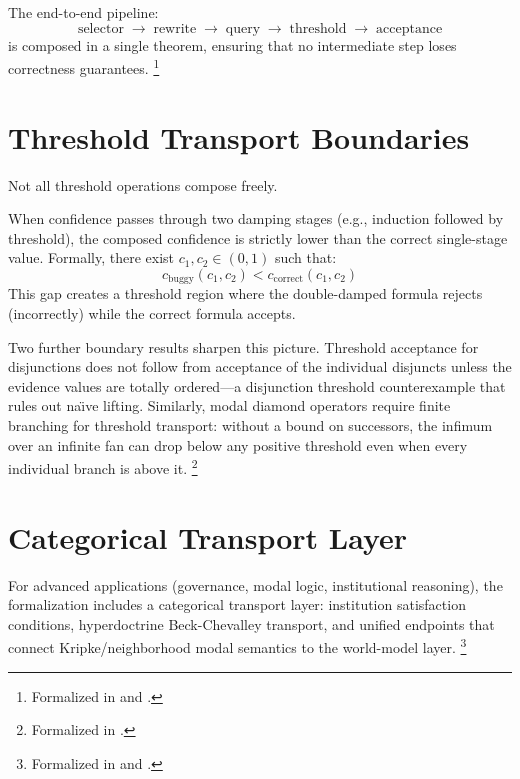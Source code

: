 \documentclass[11pt,openany]{report}
\begin{document}
The end-to-end pipeline:
\[
  \text{selector} \;\to\; \text{rewrite} \;\to\; \text{query} \;\to\;
  \text{threshold} \;\to\; \text{acceptance}
\]
is composed in a single theorem, ensuring that no intermediate step
loses correctness guarantees.%
\footnote{Formalized in 
  and .}

\section{Threshold Transport Boundaries}

Not all threshold operations compose freely.

\begin{theorem}
When confidence passes through two damping stages (e.g., induction
followed by threshold), the composed confidence is strictly lower than
the correct single-stage value.  Formally, there exist
$c_1, c_2 \in (0,1)$ such that:
\[
  c_{\mathrm{buggy}}(c_1, c_2) < c_{\mathrm{correct}}(c_1, c_2)
\]
This gap creates a threshold region where the double-damped formula
rejects (incorrectly) while the correct formula accepts.
\end{theorem}

Two further boundary results sharpen this picture.  Threshold acceptance
for disjunctions does not follow from acceptance of the individual
disjuncts unless the evidence values are totally ordered---a disjunction
threshold counterexample that rules out na\"{\i}ve lifting.  Similarly,
modal diamond operators require finite branching for threshold transport:
without a bound on successors, the infimum over an infinite fan can drop
below any positive threshold even when every individual branch is
above it.%
\footnote{Formalized in .}

\section{Categorical Transport Layer}

For advanced applications (governance, modal logic, institutional
reasoning), the formalization includes a categorical transport layer:
institution satisfaction conditions, hyperdoctrine Beck-Chevalley
transport, and unified endpoints that connect Kripke/neighborhood
modal semantics to the world-model layer.%
\footnote{Formalized in  and
  .}
\end{document}
